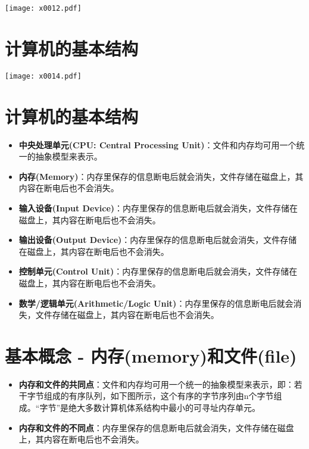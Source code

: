 \documentclass[cn,hazy,blue,14pt,screen]{elegantnote}
\begin{document}
\begin{center}
	\texttt{[image: x0012.pdf]}
\end{center}

\newpage

\section{计算机的基本结构}

\begin{center}
	\texttt{[image: x0014.pdf]}
\end{center}
\newpage

\section{计算机的基本结构}

\begin{itemize}
  \item \textbf{中央处理单元(CPU: Central Processing Unit)}：文件和内存均可用一个统一的抽象模型来表示。
  \item \textbf{内存(Memory)}：内存里保存的信息断电后就会消失，文件存储在磁盘上，其内容在断电后也不会消失。
  \item \textbf{输入设备(Input Device)}：内存里保存的信息断电后就会消失，文件存储在磁盘上，其内容在断电后也不会消失。
  \item \textbf{输出设备(Output Device)}：内存里保存的信息断电后就会消失，文件存储在磁盘上，其内容在断电后也不会消失。
  \item \textbf{控制单元(Control Unit)}：内存里保存的信息断电后就会消失，文件存储在磁盘上，其内容在断电后也不会消失。
  \item \textbf{数学/逻辑单元(Arithmetic/Logic Unit)}：内存里保存的信息断电后就会消失，文件存储在磁盘上，其内容在断电后也不会消失。
\end{itemize}

\newpage

\section{基本概念 - 内存(memory)和文件(file)}

\begin{itemize}
  \item \textbf{内存和文件的共同点}：文件和内存均可用一个统一的抽象模型来表示，即：若干字节组成的有序队列，如下图所示，这个有序的字节序列由n个字节组成。“字节”是绝大多数计算机体系结构中最小的可寻址内存单元。
  \item \textbf{内存和文件的不同点}：内存里保存的信息断电后就会消失，文件存储在磁盘上，其内容在断电后也不会消失。
\end{itemize}
\end{document}
